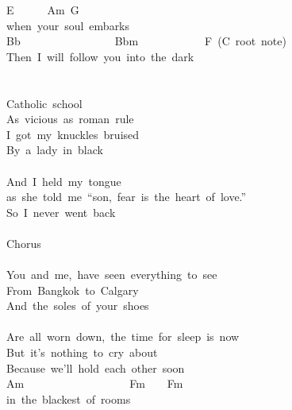 \documentclass[]{book}
\begin{document}
\hspace*{0.333em}\hspace*{0.333em}\hspace*{0.333em}\hspace*{0.333em}\hspace*{0.333em}\hspace*{0.333em}\hspace*{0.333em}\hspace*{0.333em}\hspace*{0.333em}\hspace*{0.333em}\hspace*{0.333em}E~~~~~~Am~G\\
when~your~soul~embarks\\
Bb~~~~~~~~~~~~~~~~~Bbm~~~~~~~~~~~~F~(C~root~note)\\
Then~I~will~follow~you~into~the~dark\\
~\\
~\\
Catholic~school\\
As~vicious~as~roman~rule\\
I~got~my~knuckles~bruised~\\
By~a~lady~in~black\\
\hspace*{0.333em}\hspace*{0.333em}\hspace*{0.333em}\hspace*{0.333em}\hspace*{0.333em}\\
And~I~held~my~tongue~\\
as~she~told~me~``son,~fear~is~the~heart~of~love.''~\\
So~I~never~went~back\\
~\\
Chorus\\
~\\
You~and~me,~have~seen~everything~to~see\\
From~Bangkok~to~Calgary~~\\
And~the~soles~of~your~shoes\\
\hspace*{0.333em}\\
Are~all~worn~down,~the~time~for~sleep~is~now\\
But~it's~nothing~to~cry~about~~\\
Because~we'll~hold~each~other~soon\\
Am~~~~~~~~~~~~~~~~~~~Fm~~~~Fm\\
in~the~blackest~of~rooms~\\
\end{document}
